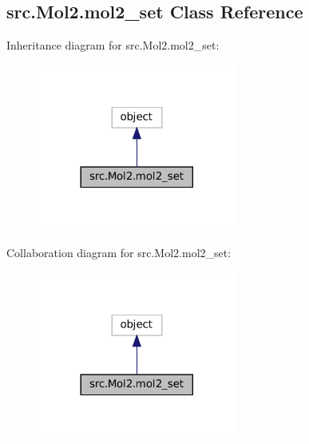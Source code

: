 \hypertarget{classsrc_1_1Mol2_1_1mol2__set}{}\subsection{src.\+Mol2.\+mol2\+\_\+set Class Reference}
\label{classsrc_1_1Mol2_1_1mol2__set}


Inheritance diagram for src.\+Mol2.\+mol2\+\_\+set\+:
\nopagebreak
\begin{figure}[H]
\begin{center}
\leavevmode
\includegraphics[width=185pt]{classsrc_1_1Mol2_1_1mol2__set__inherit__graph}
\end{center}
\end{figure}


Collaboration diagram for src.\+Mol2.\+mol2\+\_\+set\+:
\nopagebreak
\begin{figure}[H]
\begin{center}
\leavevmode
\includegraphics[width=185pt]{classsrc_1_1Mol2_1_1mol2__set__coll__graph}
\end{center}
\end{figure}
